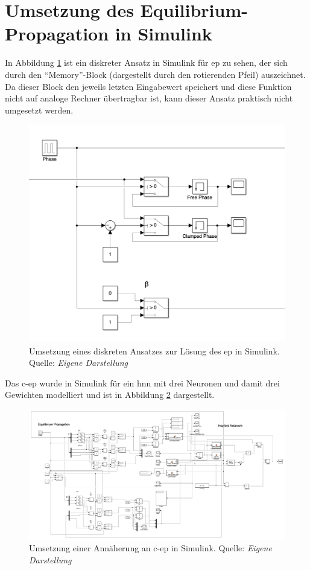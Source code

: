\section{Umsetzung des Equilibrium-Propagation in Simulink}
\label{app:Umsetzung des Equilibrium-Propagation in Simulink}

In Abbildung \ref{fig:EqProp Discrete Simulink} ist ein diskreter Ansatz in Simulink für \ac{ep} zu sehen, der sich durch den "`Memory"'-Block (dargestellt durch den rotierenden Pfeil) auszeichnet. Da dieser Block den jeweils letzten Eingabewert speichert und diese Funktion nicht auf analoge Rechner übertragbar ist, kann dieser Ansatz praktisch nicht umgesetzt werden.

\begin{figure}[h]
  \includegraphics[width=\textwidth]{abbildungen/ep_discrete_simulink.png}
  \caption{Umsetzung eines diskreten Ansatzes zur Lösung des \ac{ep} in Simulink. Quelle: \textit{Eigene Darstellung}}
  \label{fig:EqProp Discrete Simulink}
\end{figure}

Das \ac{c-ep} wurde in Simulink für ein \ac{hnn} mit drei Neuronen und damit drei Gewichten modelliert und ist in Abbildung \ref{fig:C-EP Simulink} dargestellt.

\begin{figure}[h]
  \includegraphics[width=\textwidth]{abbildungen/c-ep_simulink.png}
  \caption{Umsetzung einer Annäherung an \ac{c-ep} in Simulink. Quelle: \textit{Eigene Darstellung}}
  \label{fig:C-EP Simulink}
\end{figure}

